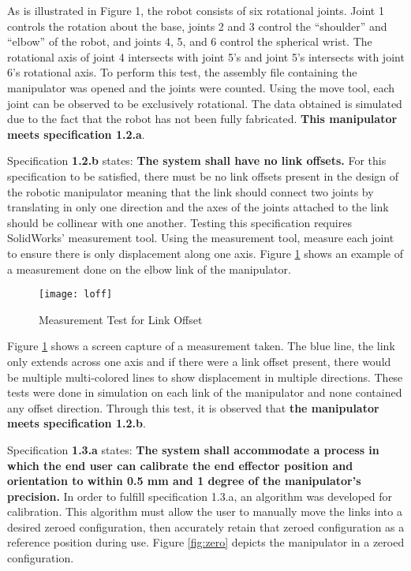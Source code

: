 As is illustrated in Figure 1, the robot consists of six rotational joints. Joint 1 controls the rotation about the base,  joints 2 and 3 control the “shoulder” and “elbow” of the robot, and joints 4, 5, and 6 control the  spherical wrist. The rotational axis of joint 4 intersects with joint 5’s and joint 5’s intersects with joint 6’s rotational axis. To perform this test, the assembly file containing the manipulator was opened and the joints were counted. Using the move tool, each joint can be observed to be exclusively rotational. The data obtained is simulated due to the fact that the robot has not been fully fabricated. \textbf{This manipulator meets specification 1.2.a}.

\newpage
Specification \textbf{1.2.b} states: \textbf{The system shall have no link offsets.} For this specification to be satisfied, there must be no link offsets present in the design of the robotic manipulator meaning that the link should connect two joints by translating in only one direction and the axes of the joints attached to the link should be collinear with one another. Testing this specification requires SolidWorks’ measurement tool. Using the measurement tool, measure each joint to ensure there is only displacement along one axis. Figure \ref{fig:loff} shows an example of a measurement done on the elbow link of the manipulator.

\begin{figure}[htp]
  \centering
  \texttt{[image: loff]}
  \caption{Measurement Test for Link Offset}
  \label{fig:loff}
\end{figure}

Figure \ref{fig:loff} shows a screen capture of a measurement taken. The blue line, the link only extends across one axis and if there were a link offset present, there would be multiple multi-colored lines to show displacement in multiple directions. These tests were done in simulation on each link of the manipulator and none contained any offset direction. Through this test, it is observed that \textbf{the manipulator meets specification 1.2.b}.

Specification \textbf{1.3.a} states: \textbf{The system shall accommodate a process in which the end user can calibrate the end effector position and orientation to within 0.5 mm and 1 degree of the manipulator’s precision.} In order to fulfill specification 1.3.a, an algorithm was developed for calibration. This algorithm must allow the user to manually move the links into a desired zeroed configuration, then accurately retain that zeroed configuration as a reference position during use. Figure \ref{fig:zero} depicts the manipulator in a zeroed configuration.

